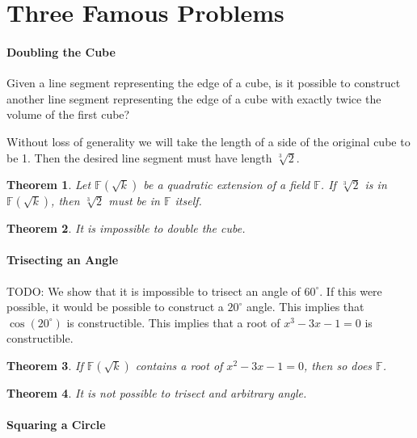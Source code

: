 \documentclass[11pt]{article}
\newtheorem{theorem}{Theorem}[section]
\theoremstyle{definition}
\begin{document}
\part{Three Famous Problems}

\subsection{Doubling the Cube}

Given a line segment representing the edge of a cube, is it possible to construct another line segment representing the edge of a cube with exactly
twice the volume of the first cube?

Without loss of generality we will take the length of a side of the original cube to be 1. Then the desired line segment must have length $\sqrt[3]{2}$.

\begin{theorem}
  Let $\mathbb{F}(\sqrt{k})$ be a quadratic extension of a field $\mathbb{F}$. If $\sqrt[3]{2}$ is in $\mathbb{F}(\sqrt{k})$, then $\sqrt[3]{2}$ must be in $\mathbb{F}$ itself.
  \label{theorem: cube root of 2}
\end{theorem}

\begin{theorem}
  It is impossible to double the cube.
  \label{theorem: can't double cube}
\end{theorem}

\subsection{Trisecting an Angle}

TODO: We show that it is impossible to trisect an angle of $60^\circ$. If this were possible, it would be possible to construct a $20^\circ$ angle. This implies that $\cos(20^\circ)$ is constructible.
This implies that a root of $x^3-3x  -1 =0$ is constructible.

\begin{theorem}
  If $\mathbb{F}(\sqrt{k})$ contains a root of $x^2-3x-1=0$, then so does $\mathbb{F}$.
  \label{theorem: trisecting set up}
\end{theorem}

\begin{theorem}
  It is not possible to trisect and arbitrary angle.
  \label{theorem: can't trisect arbitrary angle}
\end{theorem}

\subsection{Squaring a Circle}
\end{document}
